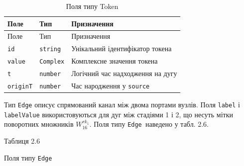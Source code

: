 \documentclass[
]{article}
\newcommand{\passthrough}[1]{#1}
\begin{document}
\begin{longtable}[]{@{}
  >{\raggedright\arraybackslash}p{}
  >{\raggedright\arraybackslash}p{}
  >{\raggedright\arraybackslash}p{}@{}}
\caption[Поля типу Token]{Поля типу Token}\tabularnewline
\toprule\noalign{}
\begin{minipage}[b]{\linewidth}\raggedright
Поле
\end{minipage} & \begin{minipage}[b]{\linewidth}\raggedright
Тип
\end{minipage} & \begin{minipage}[b]{\linewidth}\raggedright
Призначення
\end{minipage} \\
\midrule\noalign{}
\endfirsthead
\toprule\noalign{}
\begin{minipage}[b]{\linewidth}\raggedright
Поле
\end{minipage} & \begin{minipage}[b]{\linewidth}\raggedright
Тип
\end{minipage} & \begin{minipage}[b]{\linewidth}\raggedright
Призначення
\end{minipage} \\
\midrule\noalign{}
\endhead
\bottomrule\noalign{}
\endlastfoot
\passthrough{\lstinline!id!} & \passthrough{\lstinline!string!} &
Унікальний ідентифікатор токена \\
\passthrough{\lstinline!value!} & \passthrough{\lstinline!Complex!} &
Комплексне значення токена \\
\passthrough{\lstinline!t!} & \passthrough{\lstinline!number!} &
Логічний час надходження на дугу \\
\passthrough{\lstinline!originT!} & \passthrough{\lstinline!number!} &
Час народження у \passthrough{\lstinline!source!} \\
\end{longtable}

Тип \passthrough{\lstinline!Edge!} описує спрямований канал між двома
портами вузлів. Поля \passthrough{\lstinline!label!} і
\passthrough{\lstinline!labelValue!} використовуються для дуг між
стадіями 1 і 2, що несуть мітки поворотних множників
\(W_{16}^{rk_{1}}\). Поля типу
\passthrough{\lstinline!Edge!}\passthrough{\lstinline! !}наведено у
табл. 2.6.

Таблиця 2.6

Поля типу \passthrough{\lstinline!Edge!}
\end{document}
